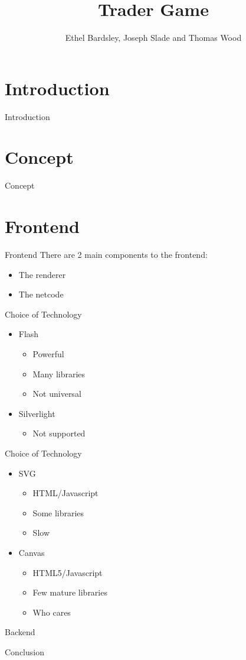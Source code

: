 \documentclass{beamer}
\title{Trader Game}
\author{Ethel Bardsley, Joseph Slade and Thomas Wood}
\begin{document}
\begin{frame}
  \titlepage
\end{frame}

\section{Introduction}
\begin{frame}{Introduction}
\end{frame}

\section{Concept}
\begin{frame}{Concept}
\end{frame}

\section{Frontend}
\begin{frame}{Frontend}
  There are 2 main components to the frontend:
  \begin{itemize}
    \item The renderer
    \item The netcode
  \end{itemize}
\end{frame}

\begin{frame}{Choice of Technology}
  \begin{itemize}
    \item Flash
      \begin{itemize}
        \item Powerful
        \item Many libraries
        \item Not universal
      \end{itemize}
    \item Silverlight
      \begin{itemize}
        \item Not supported
      \end{itemize}
  \end{itemize}
\end{frame}
\begin{frame}{Choice of Technology}
  \begin{itemize}
    \item SVG
      \begin{itemize}
        \item HTML/Javascript
        \item Some libraries
        \item Slow
      \end{itemize}
    \item Canvas
      \begin{itemize}
        \item HTML5/Javascript
        \item Few mature libraries
        \item Who cares
      \end{itemize}
  \end{itemize}
\end{frame}

\begin{frame}{Backend}
\end{frame}

\begin{frame}{Conclusion}
\end{frame}
\end{document}
